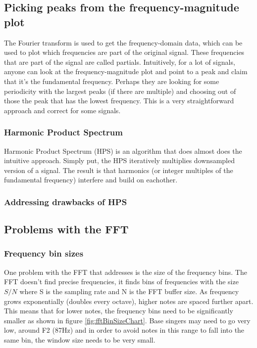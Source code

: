 \subsection{Picking peaks from the frequency-magnitude plot}
The Fourier transform is used to get the frequency-domain data, which can be used to plot which frequencies are part of the original signal. These frequencies that are part of the signal are called partials. Intuitively, for a lot of signals, anyone can look at the frequency-magnitude plot and point to a peak and claim that it's the fundamental frequency. Perhaps they are looking for some periodicity with the largest peaks (if there are multiple) and choosing out of those the peak that has the lowest frequency. This is a very straightforward approach and correct for some signals. 
\subsubsection{Harmonic Product Spectrum}
Harmonic Product Spectrum (HPS) is an algorithm that does almost does the intuitive approach. Simply put, the HPS iteratively multiplies downsampled version of a signal. The result is that harmonics (or integer multiples of the fundamental frequency) interfere and build on eachother. 

\subsubsection{Addressing drawbacks of HPS}

\subsection{Problems with the FFT}
\subsubsection{Frequency bin sizes}
One problem with the FFT that   addresses is the size of the frequency bins. The FFT doesn't find precise frequencies, it finds bins of frequencies with the size $S/N$ where S is the sampling rate and N is the FFT buffer size. As frequency grows exponentially (doubles every octave), higher notes are spaced further apart. This means that for lower notes, the frequency bins need to be significantly smaller as shown in figure \ref{fig:fftBinSizeChart}. Base singers may need to go very low, around F2 (87Hz) and in order to avoid notes in this range to fall into the same bin, the window size needs to be very small.  


